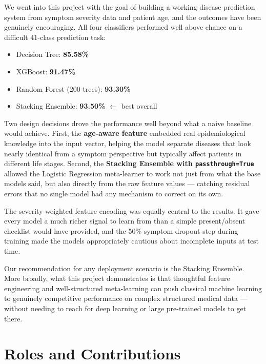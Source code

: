 \documentclass[12pt,a4paper]{article}
\begin{document}
We went into this project with the goal of building a working disease prediction system from symptom severity data and patient age, and the outcomes have been genuinely encouraging. All four classifiers performed well above chance on a difficult 41-class prediction task:

\begin{itemize}
    \item Decision Tree: \textbf{85.58\%}
    \item XGBoost: \textbf{91.47\%}
    \item Random Forest (200 trees): \textbf{93.30\%}
    \item Stacking Ensemble: \textbf{93.50\%} $\leftarrow$ best overall
\end{itemize}

Two design decisions drove the performance well beyond what a naive baseline would achieve. First, the \textbf{age-aware feature} embedded real epidemiological knowledge into the input vector, helping the model separate diseases that look nearly identical from a symptom perspective but typically affect patients in different life stages. Second, the \textbf{Stacking Ensemble with \texttt{passthrough=True}} allowed the Logistic Regression meta-learner to work not just from what the base models said, but also directly from the raw feature values --- catching residual errors that no single model had any mechanism to correct on its own.

The severity-weighted feature encoding was equally central to the results. It gave every model a much richer signal to learn from than a simple present/absent checklist would have provided, and the 50\% symptom dropout step during training made the models appropriately cautious about incomplete inputs at test time.

Our recommendation for any deployment scenario is the Stacking Ensemble. More broadly, what this project demonstrates is that thoughtful feature engineering and well-structured meta-learning can push classical machine learning to genuinely competitive performance on complex structured medical data --- without needing to reach for deep learning or large pre-trained models to get there.

\section{Roles and Contributions}
\end{document}
